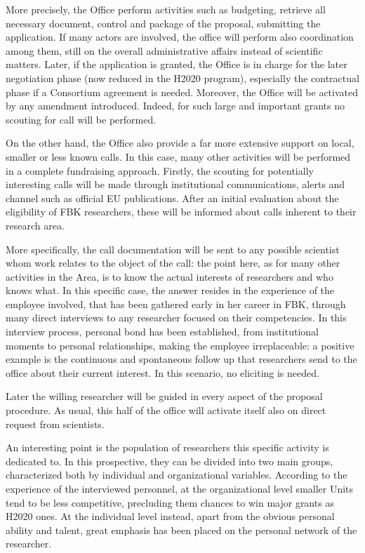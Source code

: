 More precisely, the Office perform activities such as budgeting, retrieve all necessary document, control and package of the proposal, submitting the application. If many actors are involved, the office will perform also coordination among them, still on the overall administrative affairs instead of scientific matters. Later, if the application is granted, the Office is in charge for the later negotiation phase (now reduced in the H2020 program), especially the contractual phase if a Consortium agreement is needed. Moreover, the Office will be activated by any amendment introduced. Indeed, for such large and important grants no scouting for call will be performed. 

On the other hand, the Office also provide a far more extensive support on local, smaller or less known calls. In this case, many other activities will be performed in a complete fundraising approach. Firstly, the scouting for potentially interesting calls will be made through institutional communications, alerts and channel such as official EU publications. After an initial evaluation about the eligibility of FBK researchers, these will be informed about calls inherent to their research area. 

More specifically, the call documentation will be sent to any possible scientist whom work relates to the object of the call: the point here, as for many other activities in the Area, is to know the actual interests of researchers and who knows what. In this specific case, the answer resides in the experience of the employee involved, that has been gathered early in her career in FBK, through many direct interviews to any researcher focused on their competencies. In this interview process, personal bond has been established, from institutional moments to personal relationships, making the employee irreplaceable: a positive example is the continuous and spontaneous follow up that researchers send to the office about their current interest. In this scenario, no eliciting is needed.

Later the willing researcher will be guided in every aspect of the proposal procedure. As usual, this half of the office will activate itself also on direct request from scientists. 

An interesting point is the population of researchers this specific activity is dedicated to. In this prospective, they can be divided into two main groups, characterized both by individual and organizational variables. According to the experience of the interviewed personnel, at the organizational level smaller Units tend to be less competitive, precluding them chances to win major grants as H2020 ones. At the individual level instead, apart from the obvious personal ability and talent, great emphasis has been placed on the personal network of the researcher. 

